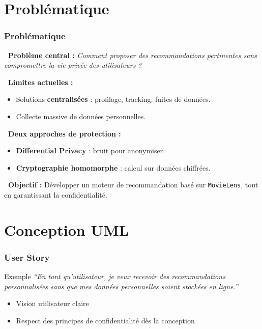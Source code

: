 \documentclass{beamer}
\newcommand{\question}{\ding{72}}   %
\newcommand{\blocked}{\ding{55}}    %
\newcommand{\lock}{\ding{115}}      %
\newcommand{\target}{\ding{93}}     %
\begin{document}
\section{Problématique}
\begin{frame}
    \frametitle{Problématique}

    \small %

    \textbf{\question~Problème central :} 
    \textit{Comment proposer des recommandations pertinentes sans compromettre la vie privée des utilisateurs ?}

    \vspace{0.2cm}
    \textbf{\blocked~Limites actuelles :}
    \begin{itemize}
        \item Solutions \textbf{centralisées} : profilage, tracking, fuites de données.
        \item Collecte massive de données personnelles.
    \end{itemize}

    \textbf{\lock~Deux approches de protection :}
    \begin{itemize}
        \item \textbf{Differential Privacy} : bruit pour anonymiser.
        \item \textbf{Cryptographie homomorphe} : calcul sur données chiffrées.
    \end{itemize}

    \textbf{\target~Objectif :} 
    Développer un moteur de recommandation basé sur \texttt{MovieLens}, tout en garantissant la confidentialité.
\end{frame}

\section{Conception UML}
\begin{frame}
    \frametitle{User Story}
    \begin{block}{Exemple}
        \textit{“En tant qu’utilisateur, je veux recevoir des recommandations personnalisées sans que mes données personnelles soient stockées en ligne.”}
    \end{block}
    \begin{itemize}
        \item Vision utilisateur claire
        \item Respect des principes de confidentialité dès la conception
    \end{itemize}
\end{frame}
\end{document}
